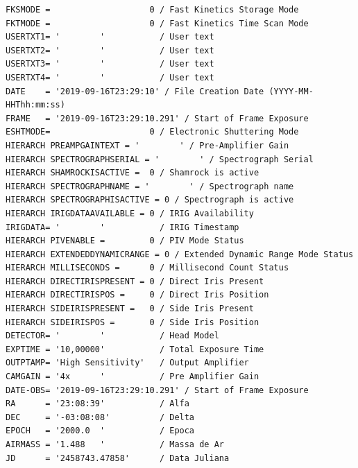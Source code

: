 \documentclass[
  letterpaper,
  DIV=11,
  numbers=noendperiod]{scrreprt}
\begin{document}
\begin{verbatim}
FKSMODE =                    0 / Fast Kinetics Storage Mode                     
FKTMODE =                    0 / Fast Kinetics Time Scan Mode                   
USERTXT1= '        '           / User text                                      
USERTXT2= '        '           / User text                                      
USERTXT3= '        '           / User text                                      
USERTXT4= '        '           / User text                                      
DATE    = '2019-09-16T23:29:10' / File Creation Date (YYYY-MM-HHThh:mm:ss)      
FRAME   = '2019-09-16T23:29:10.291' / Start of Frame Exposure                   
ESHTMODE=                    0 / Electronic Shuttering Mode                     
HIERARCH PREAMPGAINTEXT = '        ' / Pre-Amplifier Gain                       
HIERARCH SPECTROGRAPHSERIAL = '        ' / Spectrograph Serial                  
HIERARCH SHAMROCKISACTIVE =  0 / Shamrock is active                             
HIERARCH SPECTROGRAPHNAME = '        ' / Spectrograph name                      
HIERARCH SPECTROGRAPHISACTIVE = 0 / Spectrograph is active                      
HIERARCH IRIGDATAAVAILABLE = 0 / IRIG Availability                              
IRIGDATA= '        '           / IRIG Timestamp                                 
HIERARCH PIVENABLE =         0 / PIV Mode Status                                
HIERARCH EXTENDEDDYNAMICRANGE = 0 / Extended Dynamic Range Mode Status          
HIERARCH MILLISECONDS =      0 / Millisecond Count Status                       
HIERARCH DIRECTIRISPRESENT = 0 / Direct Iris Present                            
HIERARCH DIRECTIRISPOS =     0 / Direct Iris Position                           
HIERARCH SIDEIRISPRESENT =   0 / Side Iris Present                              
HIERARCH SIDEIRISPOS =       0 / Side Iris Position                             
DETECTOR= '        '           / Head Model                                     
EXPTIME = '10,00000'           / Total Exposure Time                            
OUTPTAMP= 'High Sensitivity'   / Output Amplifier                               
CAMGAIN = '4x      '           / Pre Amplifier Gain                             
DATE-OBS= '2019-09-16T23:29:10.291' / Start of Frame Exposure                   
RA      = '23:08:39'           / Alfa                                           
DEC     = '-03:08:08'          / Delta                                          
EPOCH   = '2000.0  '           / Epoca                                          
AIRMASS = '1.488   '           / Massa de Ar                                    
JD      = '2458743.47858'      / Data Juliana                                   

\end{verbatim}
\end{document}
